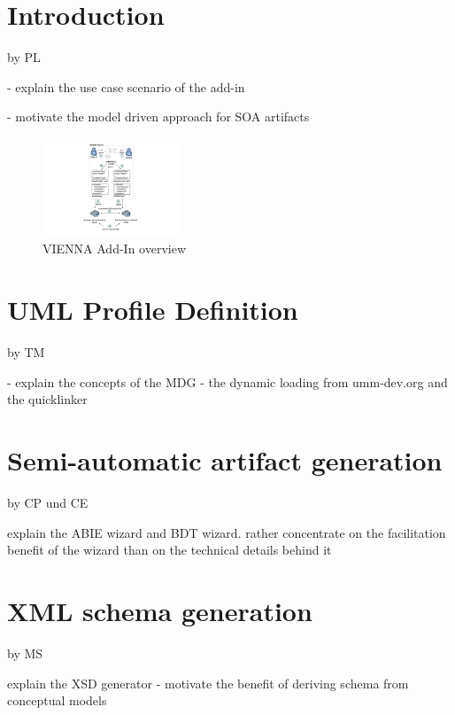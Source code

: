 \documentclass{acm_proc_article-sp}
\begin{document}






\section{Introduction} by PL

- explain the use case scenario of the add-in

- motivate the model driven approach for SOA artifacts


\begin{figure}
 \centering
   \includegraphics[width=0.37\textwidth]{figures/addinoverview.pdf}
 \caption{VIENNA Add-In overview}
 \label{fig:viennaaddinoverview}
\end{figure}


\section{UML Profile Definition} by TM

- explain the concepts of the MDG - the dynamic loading from umm-dev.org and the quicklinker

\section{Semi-automatic artifact generation} by CP und CE

explain the ABIE wizard and BDT wizard. rather concentrate on the facilitation benefit of the wizard than on the technical details behind it

\section{XML schema generation} by MS

explain the XSD generator - motivate the benefit of deriving schema from conceptual models




\nocite{man:umm2} 
\nocite{man:upcc} 
\nocite{man:VIENNAAddIn}






  
\end{document}
